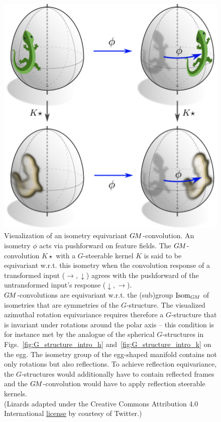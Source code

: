\begin{figure}
    \centering
    \hspace*{2ex}
    \includegraphics[width=.5\textwidth]{figures/lizard_conv_egg_intro.pdf}
    \captionsetup{width=.9\textwidth}
    \caption[]{\small
        Visualization of an isometry equivariant $G\mkern-1.4muM$-convolution.
        An isometry $\phi$ acts via pushforward on feature fields.
        The $G\mkern-1.4muM$-convolution $K\star$ with a $G$-steerable kernel $K$ is said to be equivariant w.r.t. this isometry when the convolution response of a transformed input ($\rightarrow,\downarrow$) agrees with the pushforward of the untransformed input's response ($\downarrow,\rightarrow$).
        \\[1ex]
        $G\mkern-1.4muM$-convolutions are equivariant w.r.t. the (sub)group $\operatorname{Isom}_{G\mkern-1.4muM}$ of isometries that are symmetries of the $G$-structure.
        The visualized azimuthal rotation equivariance requires therefore a $G$-structure that is invariant under rotations around the polar axis -- this condition is for instance met by the analogue of the spherical $G$-structures in Figs.~\ref{fig:G_structure_intro_h} and~\ref{fig:G_structure_intro_k} on the egg.
        The isometry group of the egg-shaped manifold contains not only rotations but also reflections.
        To achieve reflection equivariance, the $G$-structures would additionally have to contain reflected frames and the $G\mkern-1.4muM$-convolution would have to apply reflection steerable kernels.
        {\\
        \color{gray}
        \scriptsize
            (Lizards adapted under the Creative Commons Attribution 4.0 International
            \href{https://github.com/twitter/twemoji/blob/gh-pages/LICENSE-GRAPHICS}{\underline{license}}
            by courtesy of Twitter.)
        }
        \\[-16pt]
        }
    \label{fig:lizard_conv_egg_intro}
\end{figure}


